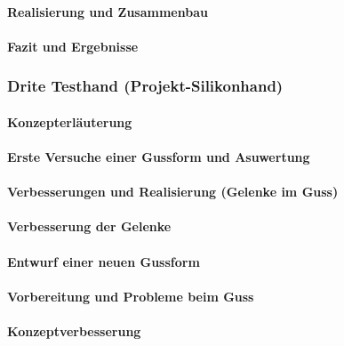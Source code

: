 \documentclass[titlepage,12pt,twoside]{article}
\begin{document}
\paragraph{Realisierung und Zusammenbau}
\hfill \break
\hfill \break

\paragraph{Fazit und Ergebnisse}
\hfill \break
\hfill \break

\subsubsection{Drite Testhand (Projekt-Silikonhand)}
\paragraph{Konzepterläuterung}
\hfill \break
\hfill \break

\paragraph{Erste Versuche einer Gussform und Asuwertung}
\hfill \break
\hfill \break

\paragraph{Verbesserungen und Realisierung (Gelenke im Guss)}
\hfill \break
\hfill \break

\paragraph{Verbesserung der Gelenke}
\hfill \break
\hfill \break

\paragraph{Entwurf einer neuen Gussform}
\hfill \break
\hfill \break

\paragraph{Vorbereitung und Probleme beim Guss}
\hfill \break
\hfill \break

\paragraph{Konzeptverbesserung}
\hfill \break
\hfill \break
\end{document}
